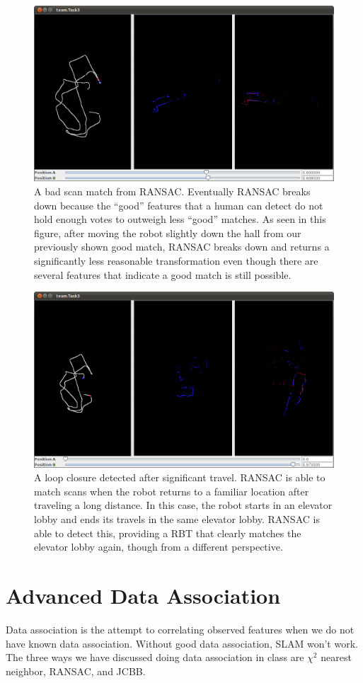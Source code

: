 \documentclass[12pt]{article}
\begin{document}
\begin{figure}[htb]
\centering
\includegraphics[width=.7\textwidth]{figures/Task3_bad0.png}
\caption{A bad scan match from RANSAC. Eventually RANSAC breaks down because the
    ``good'' features that a human can detect do not hold enough votes to outweigh
    less ``good'' matches. As seen in this figure, after moving the robot slightly
    down the hall from our previously shown good match, RANSAC breaks down and
    returns a significantly less reasonable transformation even though there are
    several features that indicate a good match is still possible.}
\label{fig:bad_ransac0}
\end{figure}

\begin{figure}[htb]
\centering
\includegraphics[width=.7\textwidth]{figures/Task3_good_endpoints.png}
\caption{A loop closure detected after significant travel. RANSAC is able to match
    scans when the robot returns to a familiar location after traveling a long
    distance. In this case, the robot starts in an elevator lobby and ends its
    travels in the same elevator lobby. RANSAC is able to detect this, providing a
    RBT that clearly matches the elevator lobby again, though from a different
    perspective.}
\label{fig:long_ransac}
\end{figure}
\section{Advanced Data Association }
	Data association is the attempt to correlating observed features when we do
not have known data association.  Without good data association, SLAM won't work.
The three ways we have discussed doing data association in class are $\chi^2$
nearest neighbor, RANSAC, and JCBB.
\end{document}

